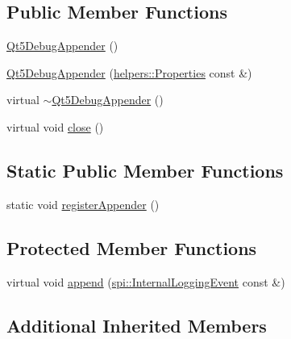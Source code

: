 \subsection*{Public Member Functions}
\begin{DoxyCompactItemize}
\item 
\hyperlink{classlog4cplus_1_1Qt5DebugAppender_a16405f7e413048eadaa67093cf6fe67e}{Qt5\-Debug\-Appender} ()
\item 
\hyperlink{classlog4cplus_1_1Qt5DebugAppender_a63c6b7eb83ce0f1786d3cdb26497897d}{Qt5\-Debug\-Appender} (\hyperlink{classlog4cplus_1_1helpers_1_1Properties}{helpers\-::\-Properties} const \&)
\item 
virtual \hyperlink{classlog4cplus_1_1Qt5DebugAppender_a0d57cb74315f8a05b996862f0d3a1fb6}{$\sim$\-Qt5\-Debug\-Appender} ()
\item 
virtual void \hyperlink{classlog4cplus_1_1Qt5DebugAppender_afeaebef2257f0f2203b602fa979789f0}{close} ()
\end{DoxyCompactItemize}
\subsection*{Static Public Member Functions}
\begin{DoxyCompactItemize}
\item 
static void \hyperlink{classlog4cplus_1_1Qt5DebugAppender_acb7381cf8a2a047c5ea27b35d59b147c}{register\-Appender} ()
\end{DoxyCompactItemize}
\subsection*{Protected Member Functions}
\begin{DoxyCompactItemize}
\item 
virtual void \hyperlink{classlog4cplus_1_1Qt5DebugAppender_a880f23f6b6f3b6d126d0db13accc47bb}{append} (\hyperlink{classlog4cplus_1_1spi_1_1InternalLoggingEvent}{spi\-::\-Internal\-Logging\-Event} const \&)
\end{DoxyCompactItemize}
\subsection*{Additional Inherited Members}


